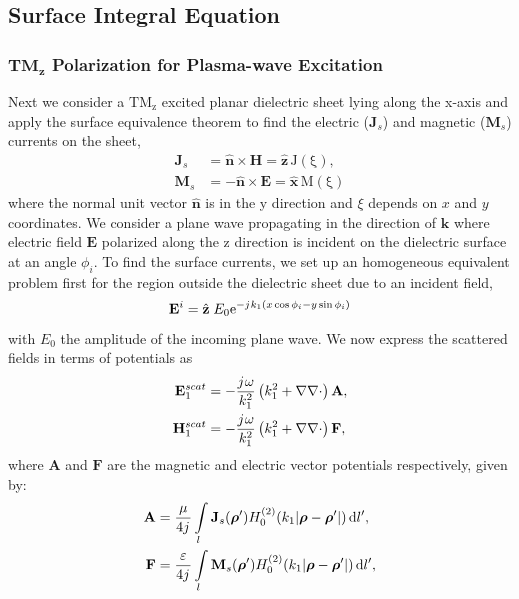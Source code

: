 \documentclass{ieeeaccess}
\renewcommand{\v}[1]{\mathbf{#1}} %
\renewcommand{\O}{\omega}  %
\newcommand{\E}{\varepsilon}  %
\renewcommand{\u}{\mu}  %
\newcommand{\p}{\rho}  %
\newcommand{\vp}{\boldsymbol \p}  %
\newcommand{\x}{\times}  %
\newcommand{\del}{\nabla}  %
\renewcommand{\^}{\hat}  %
\newcommand*\diff{\mathop{}\!\mathrm{d}} %
\newcommand{\e}{\mathrm{e}} %
\renewcommand{\j}{{j}\mkern1mu} %
\begin{document}
\subsection{Surface Integral Equation}
%
\subsubsection{$\mathbf{TM_z}$ Polarization for Plasma-wave Excitation}
%
Next we consider a $\mathrm{TM_z}$ excited planar dielectric sheet lying along the x-axis and apply the surface equivalence theorem to find the electric ($\v J_s$) and magnetic  ($\v M_s$) currents on the sheet,
\begin{subequations}
  \begin{align}
    \v J_s &=  \hat{\v{n}} \x \v{H} = \hat {\v{z}} \, \mathrm{J(\xi)},
    \label{eq:J_s}\\
    \v M_s &=  -\hat{\v{n}} \x \v{E} = \hat {\v{x}} \, \mathrm{M(\xi)}
    \label{eq:M_s}
  \end{align}
  \label{eq:eq_currents}%
\end{subequations}%
%
where the normal unit vector $\hat{\v{n}}$ is in the y direction and $\xi$ depends on $x$ and $y$ coordinates. We consider a plane wave propagating in the direction of $\v{k}$ where electric field $\v{E}$ polarized along the z direction is incident on the dielectric surface at an angle $\phi_i$. To find the surface currents, we set up an homogeneous equivalent problem first for the region outside the dielectric sheet due to an incident field,
%
\begin{equation}
  \v E^i = \hat{\v z} \; E_0  \e^{-\j k_1 (x \cos \phi_i - y \sin \phi_i)}
  \label{eq:E_i}
\end{equation}
%
with $E_0$ the amplitude of the incoming plane wave. We now express the scattered fields in terms of potentials as
%
\begin{subequations}
  \begin{align}
    \v E_1^{scat} &=  -\frac{\j \O}{k_1^2}\left( k_1^2 + \del \del \cdot \right) \v A,
    \label{eq:E1scat}\\
    \v H_1^{scat} &=  -\frac{\j \O}{k_1^2}\left( k_1^2 + \del \del \cdot \right) \v F,
    \label{eq:H1scat}
  \end{align}
  \label{eq:1scat_pot}%
\end{subequations}%
%
where $\v A$ and $\v F$ are the magnetic and electric vector potentials respectively, given by:
%
\begin{subequations}
  \begin{align}
    \v A &=  \frac{\u}{4 \j} \int\limits_{l} \v J_s(\vp') H_0^{(2)}(k_1 |\vp - \vp'|) \diff{l'},
    \label{eq:A}\\
    \v F &=  \frac{\E}{4 \j} \int\limits_{l} \v M_s(\vp') H_0^{(2)}(k_1 |\vp - \vp'|) \diff{l'},
    \label{eq:Fig}
  \end{align}
  \label{eq:potentials_2d}%
\end{subequations}%
\end{document}
